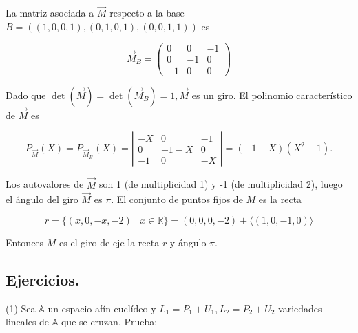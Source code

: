 \documentclass[12pt, a4paper, ones, notitlepage, openany,titlepage]{article}
\begin{document}
La matriz asociada a $\overrightarrow{M}$ respecto a la base $B=((1,0,0,1),(0,1,0,1),(0,0,1,1))$ es

$$
\overrightarrow{M}_{B}=\left(\begin{array}{rrr}
	0 & 0 & -1 \\
	0 & -1 & 0 \\
	-1 & 0 & 0
\end{array}\right)
$$

Dado que $\operatorname{det}(\overrightarrow{M})=\operatorname{det}\left(\overrightarrow{M}_{B}\right)=1, \overrightarrow{M}$ es un giro. El polinomio característico de $\overrightarrow{M}$ es

$$
P_{\overrightarrow{M}}(X)=P_{\overrightarrow{M}_{B}}(X)=\left|\begin{array}{rcr}
	-X & 0 & -1 \\
	0 & -1-X & 0 \\
	-1 & 0 & -X
\end{array}\right|=(-1-X)\left(X^{2}-1\right) .
$$

Los autovalores de $\overrightarrow{M}$ son 1 (de multiplicidad 1) y -1 (de multiplicidad 2), luego el ángulo del giro $\overrightarrow{M}$ es $\pi$. El conjunto de puntos fijos de $M$ es la recta

$$
r=\{(x, 0,-x,-2) \mid x \in \mathbb{R}\}=(0,0,0,-2)+\langle(1,0,-1,0)\rangle
$$

Entonces $M$ es el giro de eje la recta $r$ y ángulo $\pi$.

\subsection{Ejercicios.}
(1) Sea $\mathbb{A}$ un espacio afín euclídeo y $L_{1}=P_{1}+U_{1}, L_{2}=P_{2}+U_{2}$ variedades lineales de $\mathbb{A}$ que se cruzan. Prueba:
\end{document}
